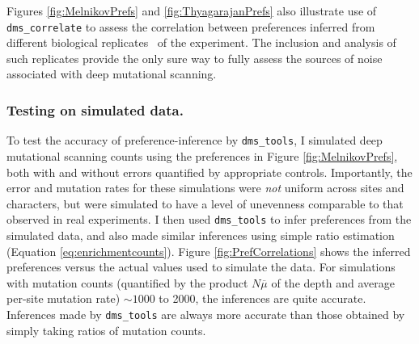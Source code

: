 \documentclass[twocolumn]{bmcart}%
\begin{document}
Figures \ref{fig:MelnikovPrefs} and \ref{fig:ThyagarajanPrefs} also illustrate use of \texttt{dms\_correlate} to assess the correlation between preferences inferred from different biological replicates~\cite{blainey2014points} of the experiment. The inclusion and analysis of such replicates provide the only sure way to fully assess the sources of noise associated with deep mutational scanning.

\subsubsection*{Testing on simulated data.}
To test the accuracy of preference-inference by \texttt{dms\_tools}, I simulated deep mutational scanning counts using the preferences in Figure \ref{fig:MelnikovPrefs}, both with and without errors quantified by appropriate controls. Importantly, the error and mutation rates for these simulations were \emph{not} uniform across sites and characters, but were simulated to have a level of unevenness comparable to that observed in real experiments. I then used \texttt{dms\_tools} to infer preferences from the simulated data, and also made similar inferences using simple ratio estimation (Equation \ref{eq:enrichmentcounts}). Figure \ref{fig:PrefCorrelations} shows the inferred preferences versus the actual values used to simulate the data. For simulations with mutation counts (quantified by the product $N\overline{\mu}$ of the depth and average per-site mutation rate) $\sim 1000$ to 2000, the inferences are quite accurate. Inferences made by \texttt{dms\_tools} are always more accurate than those obtained by simply taking ratios of mutation counts.
\end{document}
